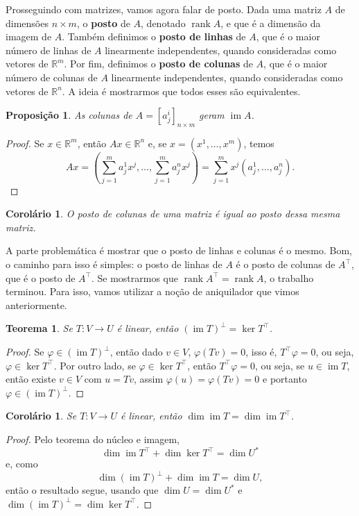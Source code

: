 \documentclass{article}
\newtheorem{proposition}[definition]{Proposição}
\newtheorem{corollary}[definition]{Corolário}
\newtheorem{theorem}[definition]{Teorema}
\DeclareMathOperator{\im}{im}
\DeclareMathOperator{\rank}{rank}
\renewcommand{\phi}{\varphi}
\begin{document}
Prosseguindo com matrizes, vamos agora falar de posto. Dada uma matriz $A$ de dimensões $n \times m$, o \textbf{posto} de $A$, denotado $\rank A$, e que é a dimensão da imagem de $A$. Também definimos o \textbf{posto de linhas} de $A$, que é o maior número de linhas de $A$ linearmente independentes, quando consideradas como vetores de $\mathbb{R}^m$. Por fim, definimos o \textbf{posto de colunas} de $A$, que é o maior número de colunas de $A$ linearmente independentes, quando consideradas como vetores de $\mathbb{R}^n$. A ideia é mostrarmos que todos esses são equivalentes.

\begin{proposition}
    As colunas de $A = [a^i_j]_{n \times m}$ geram $\im A$. 
\end{proposition}
\begin{proof}
    Se $x \in \mathbb{R}^m$, então $Ax \in \mathbb{R}^n$ e, se $x = (x^1, \dots, x^m)$, temos \begin{equation}
        Ax = \left(\sum_{j = 1}^m a^1_j x^j, \dots, \sum_{j = 1}^m a^n_j x^j\right) = \sum_{j = 1}^m x^j (a^1_j, \dots, a^n_j).
    \end{equation}
\end{proof}

\begin{corollary}
    O posto de colunas de uma matriz é igual ao posto dessa mesma matriz.
\end{corollary}

A parte problemática é mostrar que o posto de linhas e colunas é o mesmo. Bom, o caminho para isso é simples: o posto de linhas de $A$ é o posto de colunas de $A^\top$, que é o posto de $A^\top$. Se mostrarmos que $\rank A^\top = \rank A$, o trabalho terminou. Para isso, vamos utilizar a noção de aniquilador que vimos anteriormente.

\begin{theorem}
    Se $T \colon V \to U$ é linear, então $(\im T)^\perp = \ker T^\top$.
\end{theorem}
\begin{proof}
    Se $\phi \in (\im T)^\perp$, então dado $v \in V$, $\phi(Tv) = 0$, isso é, $T^\top\phi = 0$, ou seja, $\phi \in \ker T^\top$. Por outro lado, se $\phi \in \ker T^\top$, então $T^\top \phi = 0$, ou seja, se $u \in \im T$, então existe $v \in V$ com $u = Tv$, assim $\phi(u) = \phi(Tv) = 0$ e portanto $\phi \in (\im T)^\perp$.
\end{proof}

\begin{corollary}
    Se $T \colon V \to U$ é linear, então $\dim \im T = \dim \im T^\top$.
\end{corollary}
\begin{proof}
    Pelo teorema do núcleo e imagem, \begin{equation}
        \dim \im T^\top + \dim \ker T^\top = \dim U^*
    \end{equation} e, como \begin{equation}
        \dim (\im T)^\perp + \dim \im T = \dim U,
    \end{equation} então o resultado segue, usando que $\dim U = \dim U^*$ e $\dim (\im T)^\perp = \dim \ker T^\top$.
\end{proof}
\end{document}
